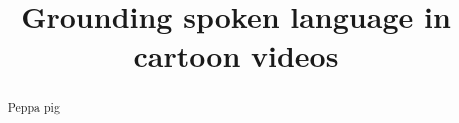 \documentclass[twoside,11pt]{article}
\begin{document}
\title{Grounding spoken language in cartoon videos}

\author{}
\date{}


\maketitle
\begin{abstract}
  \noindent
Peppa pig
\end{abstract}










\end{document}
